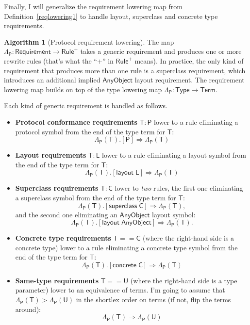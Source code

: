 \documentclass[headsepline,bibliography=totoc]{scrreport}
\newcommand{\namesym}[1]{\mathsf{#1}}
\newcommand{\proto}[1]{\bm{\mathsf{#1}}}
\newcommand{\protosym}[1]{[\proto{#1}]}
\newcommand{\layoutsym}[1]{[\mathsf{layout\;#1}]}
\newcommand{\supersym}[1]{[\mathsf{superclass}\;#1]}
\newcommand{\concretesym}[1]{[\mathsf{concrete}\;#1]}
\theoremstyle{definition}
\theoremstyle{definition}
\theoremstyle{definition}
\newtheorem{algorithm}{Algorithm}[chapter]
\begin{document}
Finally, I will generalize the requirement lowering map from Definition~\ref{reqlowering1} to handle layout, superclass and concrete type requirements.

\begin{algorithm}[Protocol requirement lowering]\label{lowerreqinproto}
The map $\Lambda_{\proto{P}}\colon\namesym{Requirement}\rightarrow\namesym{Rule}^+$ takes a generic requirement and produces one or more rewrite rules (that's what the ``$+$'' in $\namesym{Rule}^+$ means). In practice, the only kind of requirement that produces more than one rule is a superclass requirement, which introduces an additional implied $\namesym{AnyObject}$ layout requirement. The requirement lowering map builds on top of the type lowering map $\Lambda_{\proto{P}}\colon \namesym{Type} \rightarrow \namesym {Term}$.

Each kind of generic requirement is handled as follows.
\begin{itemize}
\item \textbf{Protocol conformance requirements} $\namesym{T}\colon\proto{P}$ lower to a rule eliminating a protocol symbol from the end of the type term for $\namesym{T}$:
\[\Lambda_{\proto{P}}(\namesym{T}).\protosym{P} \Rightarrow \Lambda_{\proto{P}}(\namesym{T})\]
\item \textbf{Layout requirements} $\namesym{T}\colon\namesym{L}$ lower to a rule eliminating a layout symbol from the end of the type term for $\namesym{T}$:
\[\Lambda_{\proto{P}}(\namesym{T}).\layoutsym{L} \Rightarrow \Lambda_{\proto{P}}(\namesym{T})\]
\item \textbf{Superclass requirements} $\namesym{T}\colon\namesym{C}$ lower to \emph{two} rules, the first one eliminating a superclass symbol from the end of the type term for $\namesym{T}$:
\[\Lambda_{\proto{P}}(\namesym{T}).\supersym{\namesym{C}} \Rightarrow \Lambda_{\proto{P}}(\namesym{T}),\]
and the second one eliminating an $\namesym{AnyObject}$ layout symbol:
\[\Lambda_{\proto{P}}(\namesym{T}).\layoutsym{\namesym{AnyObject}} \Rightarrow \Lambda_{\proto{P}}(\namesym{T}).\]
\item \textbf{Concrete type requirements} $\namesym{T}==\namesym{C}$ (where the right-hand side is a concrete type) lower to a rule eliminating a concrete type symbol from the end of the type term for $\namesym{T}$:
\[\Lambda_{\proto{P}}(\namesym{T}).\concretesym{\namesym{C}}\Rightarrow\Lambda_{\proto{P}}(\namesym{T})\]
\item \textbf{Same-type requirements} $\namesym{T}==\namesym{U}$ (where the right-hand side is a type parameter) lower to an equivalence of terms. I'm going to assume that $\Lambda_{\proto{P}}(\namesym{T}) > \Lambda_{\proto{P}}(\namesym{U})$ in the shortlex order on terms (if not, flip the terms around):
\[\Lambda_{\proto{P}}(\namesym{T}) \Rightarrow \Lambda_{\proto{P}}(\namesym{U})\]
\end{itemize}
\end{algorithm}
\end{document}
